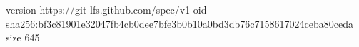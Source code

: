 version https://git-lfs.github.com/spec/v1
oid sha256:bf3c81901e32047fb4cb0dee7bfe3b0b10a0bd3db76c7158617024ceba80ceda
size 645
